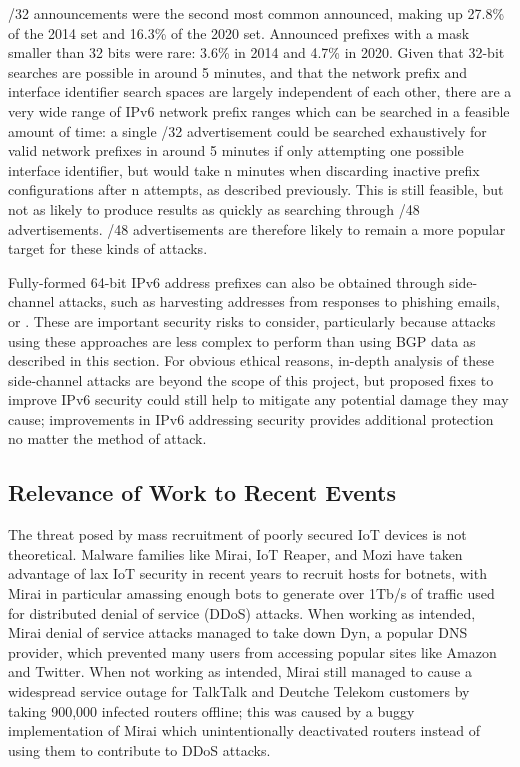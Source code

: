 \documentclass[10pt,sigconf]{acmart}
\begin{document}
/32 announcements were the second most common announced, making up 27.8\% of the 2014 set and 16.3\% of the 2020 set.
Announced prefixes with a mask smaller than 32 bits were rare:
3.6\% in 2014 and 4.7\% in 2020.
Given that 32-bit searches are possible in around 5 minutes, and that the network prefix and interface identifier search spaces are largely independent of each other, there are a very wide range of IPv6 network prefix ranges which can be searched in a feasible amount of time:
a single /32 advertisement could be searched exhaustively for valid network prefixes in around 5 minutes if only attempting one possible interface identifier, but would take n minutes when discarding inactive prefix configurations after n attempts, as described previously.
This is still feasible, but not as likely to produce results as quickly as searching through /48 advertisements.
/48 advertisements are therefore likely to remain a more popular target for these kinds of attacks.


Fully-formed 64-bit IPv6 address prefixes can also be obtained through side-channel attacks, such as harvesting addresses from responses to phishing emails, or .
These are important security risks to consider, particularly because attacks using these approaches are less complex to perform than using BGP data as described in this section.
For obvious ethical reasons, in-depth analysis of these side-channel attacks are beyond the scope of this project, but proposed fixes to improve IPv6 security could still help to mitigate any potential damage they may cause;
improvements in IPv6 addressing security provides additional protection no matter the method of attack.

\subsection{Relevance of Work to Recent Events}
The threat posed by mass recruitment of poorly secured IoT devices is not theoretical.
Malware families like Mirai, IoT Reaper, and Mozi have taken advantage of lax IoT security in recent years to recruit hosts for botnets, with Mirai in particular amassing enough bots to generate over 1Tb/s of traffic used for distributed denial of service (DDoS) attacks.
When working as intended, Mirai denial of service attacks managed to take down Dyn, a popular DNS provider, which prevented many users from accessing popular sites like Amazon and Twitter.
When not working as intended, Mirai still managed to cause a widespread service outage for TalkTalk and Deutche Telekom customers by taking 900,000 infected routers offline;
this was caused by a buggy implementation of Mirai which unintentionally deactivated routers instead of using them to contribute to DDoS attacks.
\end{document}
